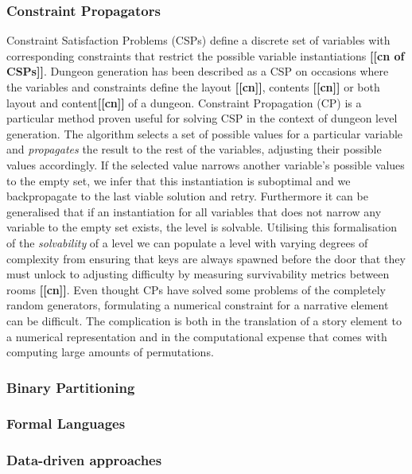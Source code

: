 \documentclass{UoYCSproject}
\begin{document}
\subsubsection{Constraint Propagators}
Constraint Satisfaction Problems (CSPs) define a discrete set of variables with corresponding constraints that restrict the possible variable instantiations \textbf{[[cn  of CSPs]]}. Dungeon generation has been described as a CSP on occasions where the variables and constraints define the layout \textbf{[[cn]]}, contents \textbf{[[cn]]} or both layout and content\textbf{[[cn]]} of a dungeon. Constraint Propagation (CP) is a particular method proven useful for solving CSP in the context of dungeon level generation. The algorithm selects a set of possible values for a particular variable and \textit{propagates} the result to the rest of the variables, adjusting their possible values accordingly. If the selected value narrows another variable's possible values to the empty set, we infer that this instantiation is suboptimal and we backpropagate to the last viable solution and retry. Furthermore it can be generalised that if an instantiation for all variables that does not narrow any variable to the empty set exists, the level is solvable. Utilising this formalisation of the \textit{solvability} of a level we can populate a level with varying degrees of complexity from ensuring that keys are always spawned before the door that they must unlock to adjusting difficulty by measuring survivability metrics between rooms \textbf{[[cn]]}. Even thought CPs have solved some problems of the completely random generators, formulating a numerical constraint for a narrative element can be difficult. The complication is both in the translation of a story element to a numerical representation and in the computational expense that comes with computing large amounts of permutations.

\subsubsection{Binary Partitioning}

\subsubsection{Formal Languages}

\subsubsection{Data-driven approaches}
\end{document}
